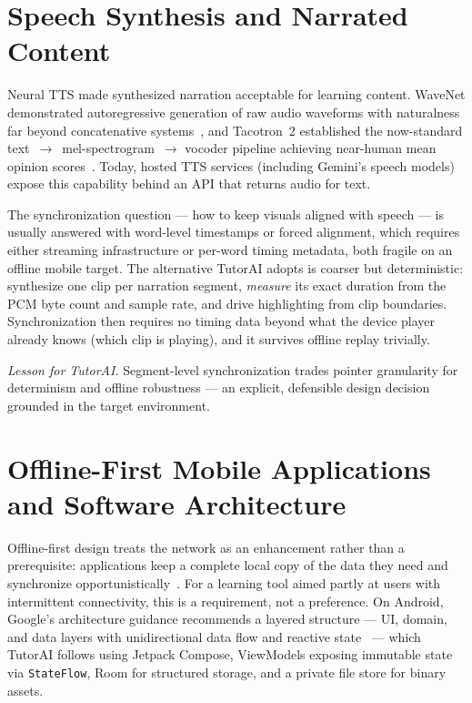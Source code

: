 \section{Speech Synthesis and Narrated Content}

Neural TTS made synthesized narration acceptable for learning content.
WaveNet demonstrated autoregressive generation of raw audio waveforms with
naturalness far beyond concatenative systems~\cite{oord2016wavenet}, and
Tacotron~2 established the now-standard text~$\to$~mel-spectrogram~$\to$
vocoder pipeline achieving near-human mean opinion scores~\cite{shen2018tacotron2}.
Today, hosted TTS services (including Gemini's speech models) expose this
capability behind an API that returns audio for text.

The synchronization question --- how to keep visuals aligned with speech ---
is usually answered with word-level timestamps or forced alignment, which
requires either streaming infrastructure or per-word timing metadata, both
fragile on an offline mobile target. The alternative TutorAI adopts is
coarser but deterministic: synthesize one clip per narration segment,
\emph{measure} its exact duration from the PCM byte count and sample rate,
and drive highlighting from clip boundaries. Synchronization then requires no
timing data beyond what the device player already knows (which clip is
playing), and it survives offline replay trivially.

\emph{Lesson for TutorAI.} Segment-level synchronization trades pointer
granularity for determinism and offline robustness --- an explicit,
defensible design decision grounded in the target environment.

\section{Offline-First Mobile Applications and Software Architecture}

Offline-first design treats the network as an enhancement rather than a
prerequisite: applications keep a complete local copy of the data they need
and synchronize opportunistically~\cite{offlinefirst}. For a learning tool
aimed partly at users with intermittent connectivity, this is a requirement,
not a preference. On Android, Google's architecture guidance recommends a
layered structure --- UI, domain, and data layers with unidirectional data
flow and reactive state~\cite{androidguide} --- which TutorAI follows using
Jetpack Compose, ViewModels exposing immutable state via \texttt{StateFlow},
Room for structured storage, and a private file store for binary assets.


